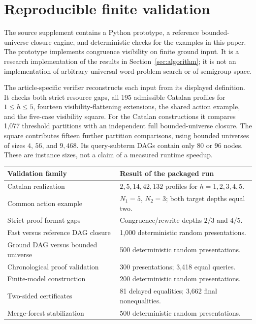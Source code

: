\section{Reproducible finite validation}\label{sec:validation}

The source supplement contains a Python prototype, a reference bounded-universe closure engine, and deterministic checks for the examples in this paper. The prototype implements congruence visibility on finite ground input. It is a research implementation of the results in Section~\ref{sec:algorithm}; it is not an implementation of arbitrary universal word-problem search or of semigroup space.

The article-specific verifier reconstructs each input from its displayed definition. It checks both strict resource gaps, all 195 admissible Catalan profiles for $1\le h\le5$, fourteen visibility-flattening extensions, the shared action example, and the five-case visibility square. For the Catalan constructions it compares 1,077 threshold partitions with an independent full bounded-universe closure. The square contributes fifteen further partition comparisons, using bounded universes of sizes $4$, $56$, and $9{,}468$. Its query-subterm DAGs contain only 80 or 96 nodes. These are instance sizes, not a claim of a measured runtime speedup.

\begin{center}
\begin{tabularx}{\textwidth}{@{}lX@{}}
\toprule
Validation family & Result of the packaged run\\
\midrule
Catalan realization & $2,5,14,42,132$ profiles for $h=1,2,3,4,5$.\\
Common action example & $N_1=5$, $N_2=3$; both target depths equal two.\\
Strict proof-format gaps & Congruence/rewrite depths $2/3$ and $4/5$.\\
Fast versus reference DAG closure & 1,000 deterministic random presentations.\\
Ground DAG versus bounded universe & 500 deterministic random presentations.\\
Chronological proof validation & 300 presentations; 3,418 equal queries.\\
Finite-model construction & 200 deterministic random presentations.\\
Two-sided certificates & 81 delayed equalities; 3,662 final nonequalities.\\
Merge-forest stabilization & 500 deterministic random presentations.\\
\bottomrule
\end{tabularx}
\end{center}

